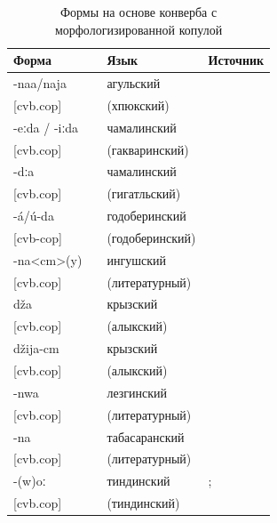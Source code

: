 \begin{table}[ht]
\caption{Формы на основе конверба с морфологизированной копулой}
\label{tab:pfcvbcopred}
\vspace{0.2cm}
\begin{center}
\begin{tabular}{ll|ll}
\multicolumn{2}{l|}{Форма} & Язык      & Источник               \\ \hline
-naa/naja	&		&	агульский	&	\citep{maisaklezgpf}	\\
{[}cvb.cop{]}	&		&	(хпюкский)	&		\\
-eːda / -iːda 	&		&	чамалинский	&	\citep{bokarev1949chamalal}	\\
{[}cvb.cop{]}	&		&	(гакваринский)	&		\\
-dːa	&		&	чамалинский	&	\citep{bokarev1949chamalal}	\\
{[}cvb.cop{]}	&		&	(гигатльский)	&		\\
-á/ú-da 	&		&	годоберинский	&	\citep{dobrushinatatevosov1996}	\\
{[}cvb-cop{]}	&		&	(годоберинский)	&		\\
-na<cm>(y) 	&		&	ингушский	&	\citep{nichols2011}	\\
{[}cvb.cop{]}	&		&	(литературный)	&		\\
dža	&		&	крызский	&	\citep{authier2009}	\\
{[}cvb.cop{]}	&		&	(алыкский)	&		\\
džija-cm	&		&	крызский	&	\citep{authier2009}	\\
{[}cvb.cop{]}	&		&	(алыкский)	&		\\
-nwa	&		&	лезгинский	&	\citep{haspelmath1993}	\\
{[}cvb.cop{]}	&		&	(литературный)	&		\\
-na	&		&	табасаранский	&	\citep{maisaklezgpf}	\\
{[}cvb.cop{]}	&		&	(литературный)	&		\\
-(w)oː	&		&	тиндинский	&	\citep{magomedova2012};	\\
{[}cvb.cop{]}	&		&	(тиндинский)	& \citep{authiertindi}	\\
\end{tabular}
\end{center}
\end{table}

